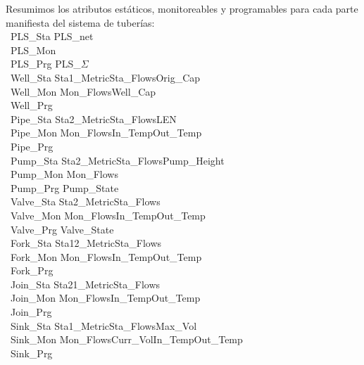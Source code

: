 \noindent
\begynd
\pind Resumimos los atributos estáticos, monitoreables y programables
      para cada parte manifiesta del sistema de tuberías:
\afslut      
\bp
{}\\
\>\ PLS\_Sta {\EQ} PLS\_net{\TIMES}{\DOTDOTDOT}\\
\>\ PLS\_Mon {\EQ} {\DOTDOTDOT}\\
\>\ PLS\_Prg {\EQ} PLS\_$\Sigma${\TIMES}{\DOTDOTDOT}\\
\>\ Well\_Sta {\EQ} Sta1\_Metric{\TIMES}Sta\_Flows{\TIMES}Orig\_Cap{\TIMES}{\DOTDOTDOT}\\
\>\ Well\_Mon {\EQ} Mon\_Flows{\TIMES}Well\_Cap{\TIMES}{\DOTDOTDOT}\\
\>\ Well\_Prg {\EQ} {\DOTDOTDOT} \\
\>\ Pipe\_Sta {\EQ} Sta2\_Metric{\TIMES}Sta\_Flows{\TIMES}LEN{\TIMES}{\DOTDOTDOT}\\
\>\ Pipe\_Mon {\EQ} Mon\_Flows{\TIMES}In\_Temp{\TIMES}Out\_Temp{\TIMES}{\DOTDOTDOT}\\
\>\ Pipe\_Prg {\EQ} {\DOTDOTDOT}\ \ \\
\>\ Pump\_Sta {\EQ} Sta2\_Metric{\TIMES}Sta\_Flows{\TIMES}Pump\_Height{\TIMES}{\DOTDOTDOT}\\
\>\ Pump\_Mon {\EQ} Mon\_Flows{\TIMES}{\DOTDOTDOT}\\
\>\ Pump\_Prg {\EQ} Pump\_State{\TIMES}{\DOTDOTDOT}\\
\>\ Valve\_Sta {\EQ} Sta2\_Metric{\TIMES}Sta\_Flows{\TIMES}{\DOTDOTDOT}\\
\>\ Valve\_Mon {\EQ} Mon\_Flows{\TIMES}In\_Temp{\TIMES}Out\_Temp{\TIMES}{\DOTDOTDOT}\\
\>\ Valve\_Prg {\EQ} Valve\_State{\TIMES}{\DOTDOTDOT}\\
\>\ Fork\_Sta {\EQ} Sta12\_Metric{\TIMES}Sta\_Flows{\TIMES}{\DOTDOTDOT}\\
\>\ Fork\_Mon {\EQ} Mon\_Flows{\TIMES}In\_Temp{\TIMES}Out\_Temp{\TIMES}{\DOTDOTDOT}\\
\>\ Fork\_Prg {\EQ} {\DOTDOTDOT} \\
\>\ Join\_Sta {\EQ} Sta21\_Metric{\TIMES}Sta\_Flows{\TIMES}{\DOTDOTDOT}\\
\>\ Join\_Mon {\EQ} Mon\_Flows{\TIMES}In\_Temp{\TIMES}Out\_Temp{\TIMES}{\DOTDOTDOT}\\
\>\ Join\_Prg {\EQ} {\DOTDOTDOT}\\
\>\ Sink\_Sta {\EQ} Sta1\_Metric{\TIMES}Sta\_Flows{\TIMES}Max\_Vol{\TIMES}{\DOTDOTDOT}\\
\>\ Sink\_Mon {\EQ} Mon\_Flows{\TIMES}Curr\_Vol{\TIMES}In\_Temp{\TIMES}Out\_Temp{\TIMES}{\DOTDOTDOT}\\
\>\ Sink\_Prg {\EQ} {\DOTDOTDOT} 
\ep

